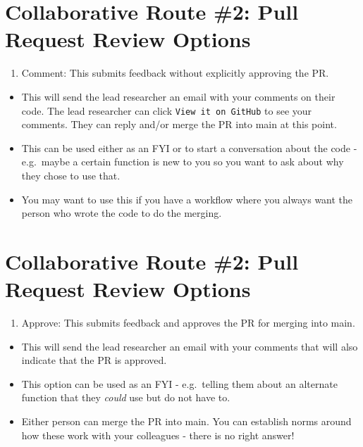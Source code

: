 \documentclass[
]{book}
\providecommand{\tightlist}{%
  \setlength{\itemsep}{0pt}\setlength{\parskip}{0pt}}
\begin{document}
\hypertarget{collaborative-route-2-pull-request-review-options}{%
\section{Collaborative Route \#2: Pull Request Review Options}\label{collaborative-route-2-pull-request-review-options}}

\begin{enumerate}
\def\labelenumi{\arabic{enumi}.}
\tightlist
\item
  Comment: This submits feedback without explicitly approving the PR.
\end{enumerate}

\begin{itemize}
\tightlist
\item
  This will send the lead researcher an email with your comments on their code. The lead researcher can click \texttt{View\ it\ on\ GitHub} to see your comments. They can reply and/or merge the PR into main at this point.
\item
  This can be used either as an FYI or to start a conversation about the code - e.g.~maybe a certain function is new to you so you want to ask about why they chose to use that.
\item
  You may want to use this if you have a workflow where you always want the person who wrote the code to do the merging.
\end{itemize}

\hypertarget{collaborative-route-2-pull-request-review-options-1}{%
\section{Collaborative Route \#2: Pull Request Review Options}\label{collaborative-route-2-pull-request-review-options-1}}

\begin{enumerate}
\def\labelenumi{\arabic{enumi}.}
\setcounter{enumi}{1}
\tightlist
\item
  Approve: This submits feedback and approves the PR for merging into main.
\end{enumerate}

\begin{itemize}
\tightlist
\item
  This will send the lead researcher an email with your comments that will also indicate that the PR is approved.
\item
  This option can be used as an FYI - e.g.~telling them about an alternate function that they \emph{could} use but do not have to.
\item
  Either person can merge the PR into main. You can establish norms around how these work with your colleagues - there is no right answer!
\end{itemize}
\end{document}
